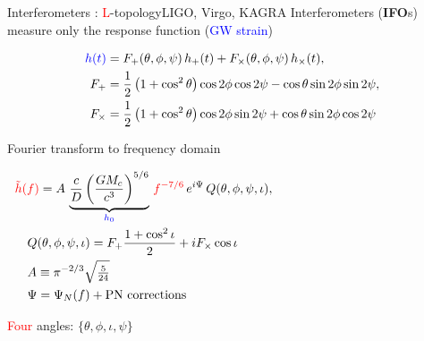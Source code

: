 \documentclass[xcolor=dvipsnames,t]{beamer}
\newcommand{\red}[1]{\textcolor{red}{#1}}
\newcommand{\bl}[1]{\textcolor{blue}{#1}}
\newcommand{\f}{\frac}
\begin{document}
\begin{frame}{Interferometers : \red{L}-topology}{LIGO, Virgo, KAGRA}
  \vspace{-2mm}
  Interferometers ({\bf IFO}s) measure only the response function (\bl{GW strain})
  \begin{footnotesize}
  \begin{align*}
   \bl{h(t)} &= F_+(\theta,\phi,\psi) \,h_+(t)+F_\times(\theta,\phi,\psi)\, h_\times(t) , \\
    F_+ &=\f{1}{2}\left(1+\cos^2\theta\right)\cos2\phi\cos 2\psi-\cos\theta \sin2\phi \sin2\psi, \\
    F_\times &=\f{1}{2}\left(1+\cos^2\theta\right)\cos2\phi\sin2\psi+\cos\theta \sin2\phi \cos2\psi
   \end{align*}
   \end{footnotesize}
   {
      Fourier transform to frequency domain 
      \begin{footnotesize}
      \begin{align*}
      &\red{\tilde{h}(f)} =A\, \underbrace{\f{c}{D}\left(\f{G M_c}{c^3}\right)^{5/6}}_{\bl{h_0}} \,\red{f^{-7/6}}\, e^{i\Psi}\, Q(\theta,\phi,\psi,\iota),\hspace{5cm} \\
	&\quad Q(\theta,\phi,\psi,\iota) = F_+\f{1+\cos^2\iota}{2}  + i F_\times \cos\iota \\
      &\quad A\equiv \pi^{-2/3}\sqrt{\tfrac{5}{24}}\\
      &\quad \Psi = \Psi_N(f) + \text{PN corrections}
	\end{align*}
	\end{footnotesize}
    }
    {
      \red{Four} angles: $\{\theta,\phi,\iota,\psi \}$
    }   
\end{frame}
\end{document}
